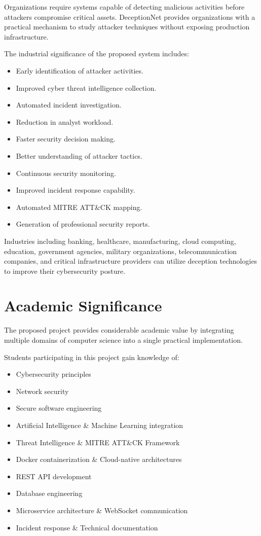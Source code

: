 \documentclass[12pt,a4paper]{report}
\begin{document}
Organizations require systems capable of detecting malicious activities before attackers compromise critical assets. DeceptionNet provides organizations with a practical mechanism to study attacker techniques without exposing production infrastructure.

The industrial significance of the proposed system includes:

\begin{itemize}
\item Early identification of attacker activities.
\item Improved cyber threat intelligence collection.
\item Automated incident investigation.
\item Reduction in analyst workload.
\item Faster security decision making.
\item Better understanding of attacker tactics.
\item Continuous security monitoring.
\item Improved incident response capability.
\item Automated MITRE ATT\&CK mapping.
\item Generation of professional security reports.
\end{itemize}

Industries including banking, healthcare, manufacturing, cloud computing, education, government agencies, military organizations, telecommunication companies, and critical infrastructure providers can utilize deception technologies to improve their cybersecurity posture.


\section{Academic Significance}

The proposed project provides considerable academic value by integrating multiple domains of computer science into a single practical implementation.

Students participating in this project gain knowledge of:

\begin{itemize}
\item Cybersecurity principles
\item Network security
\item Secure software engineering
\item Artificial Intelligence \& Machine Learning integration
\item Threat Intelligence \& MITRE ATT\&CK Framework
\item Docker containerization \& Cloud-native architectures
\item REST API development
\item Database engineering
\item Microservice architecture \& WebSocket communication
\item Incident response \& Technical documentation
\end{itemize}
\end{document}
